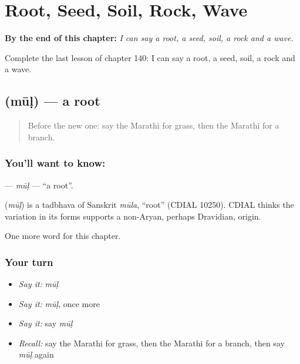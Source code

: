 
\chapter{Root, Seed, Soil, Rock, Wave}
\label{ch:mr-root-seed-soil-rock-wave}

\begin{chapteropening}
\textbf{By the end of this chapter:} \emph{I can say a root, a seed, soil, a rock and a wave.}

Complete the last lesson of chapter 140: I can say a root, a seed, soil, a rock and a wave.
\end{chapteropening}

\section[\texorpdfstring{\mr{मूळ} (mūḷ)}{मूळ (mūḷ)}]{ (mūḷ) — a root}

\label{lesson:MR-C140-mul}



\begin{quote}
Before the new one: say the Marathi for grass, then the Marathi for a branch.
\end{quote}

\subsection*{You'll want to know: }
\textbf{} — \emph{mūḷ} — \textquotedblleft{}a root\textquotedblright{}.

\begin{cousinweb}
\textbf{} (\emph{mūḷ}) is a tadbhava of Sanskrit \emph{mūla}, \textquotedblleft{}root\textquotedblright{} (CDIAL 10250). CDIAL thinks the variation in its forms supports a non-Aryan, perhaps Dravidian, origin.
\end{cousinweb}

\begin{grammarlens}[title={What you've built}]
One more word for this chapter.
\end{grammarlens}

\subsection*{Your turn}
\begin{itemize}
\raggedright
  \item \emph{Say it:} \emph{mūḷ}
  \item \emph{Say it:} \emph{mūḷ}, once more
  \item \emph{Say it:} say \emph{mūḷ}
  \item \emph{Recall:} say the Marathi for grass, then the Marathi for a branch, then say \emph{mūḷ} again
\end{itemize}

